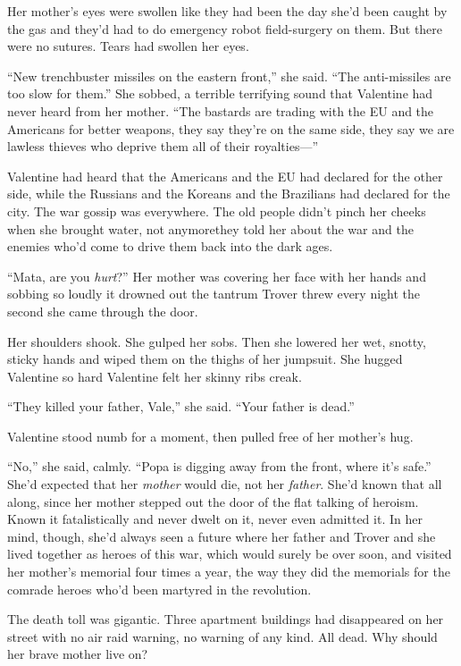 Her mother’s eyes were swollen like they had been the day she’d
been caught by the gas and they’d had to do emergency robot
field-surgery on them. But there were no sutures. Tears had swollen
her eyes.

“New trenchbuster missiles on the eastern front,” she said. “The
anti-missiles are too slow for them.” She sobbed, a terrible
terrifying sound that Valentine had never heard from her mother.
“The bastards are trading with the EU and the Americans for better
weapons, they say they’re on the same side, they say we are lawless
thieves who deprive them all of their royalties---”

Valentine had heard that the Americans and the EU had declared for
the other side, while the Russians and the Koreans and the
Brazilians had declared for the city. The war gossip was
everywhere. The old people didn’t pinch her cheeks when she brought
water, not anymore\dash{}they told her about the war and the enemies
who’d come to drive them back into the dark ages.

“Mata, are you \emph{hurt}?” Her mother was covering her face with
her hands and sobbing so loudly it drowned out the tantrum Trover
threw every night the second she came through the door.

Her shoulders shook. She gulped her sobs. Then she lowered her wet,
snotty, sticky hands and wiped them on the thighs of her jumpsuit.
She hugged Valentine so hard Valentine felt her skinny ribs creak.

“They killed your father, Vale,” she said. “Your father is dead.”

Valentine stood numb for a moment, then pulled free of her mother’s
hug.

“No,” she said, calmly. “Popa is digging away from the front, where
it’s safe.” She’d expected that her \emph{mother} would die, not
her \emph{father}. She’d known that all along, since her mother
stepped out the door of the flat talking of heroism. Known it
fatalistically and never dwelt on it, never even admitted it. In
her mind, though, she’d always seen a future where her father and
Trover and she lived together as heroes of this war, which would
surely be over soon, and visited her mother’s memorial four times a
year, the way they did the memorials for the comrade heroes who’d
been martyred in the revolution.

The death toll was gigantic. Three apartment buildings had
disappeared on her street with no air raid warning, no warning of
any kind. All dead. Why should her brave mother live on?

